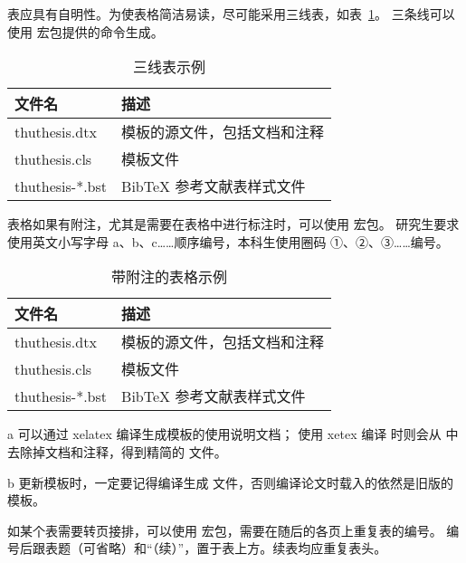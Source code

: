 表应具有自明性。为使表格简洁易读，尽可能采用三线表，如表~\ref{tab:three-line}。
三条线可以使用  宏包提供的命令生成。

\begin{table}
  \centering
  \caption{三线表示例}
  \begin{tabular}{ll}
    \toprule
    文件名          & 描述                         \\
    \midrule
    thuthesis.dtx   & 模板的源文件，包括文档和注释 \\
    thuthesis.cls   & 模板文件                     \\
    thuthesis-*.bst & BibTeX 参考文献表样式文件    \\
    \bottomrule
  \end{tabular}
  \label{tab:three-line}
\end{table}

表格如果有附注，尤其是需要在表格中进行标注时，可以使用 宏包。
研究生要求使用英文小写字母 a、b、c……顺序编号，本科生使用圈码 ①、②、③……编号。

\begin{table}
  \centering
  \begin{threeparttable}[c]
    \caption{带附注的表格示例}
    \label{tab:three-part-table}
    \begin{tabular}{ll}
      \toprule
      文件名                 & 描述                         \\
      \midrule
      thuthesis.dtx\tnote{a} & 模板的源文件，包括文档和注释 \\
      thuthesis.cls\tnote{b} & 模板文件                     \\
      thuthesis-*.bst        & BibTeX 参考文献表样式文件    \\
      \bottomrule
    \end{tabular}
    \begin{tablenotes}
      \item [a] 可以通过 xelatex 编译生成模板的使用说明文档；
        使用 xetex 编译 时则会从  中去除掉文档和注释，得到精简的  文件。
      \item [b] 更新模板时，一定要记得编译生成  文件，否则编译论文时载入的依然是旧版的模板。
    \end{tablenotes}
  \end{threeparttable}
\end{table}

如某个表需要转页接排，可以使用 宏包，需要在随后的各页上重复表的编号。
编号后跟表题（可省略）和“（续）”，置于表上方。续表均应重复表头。

